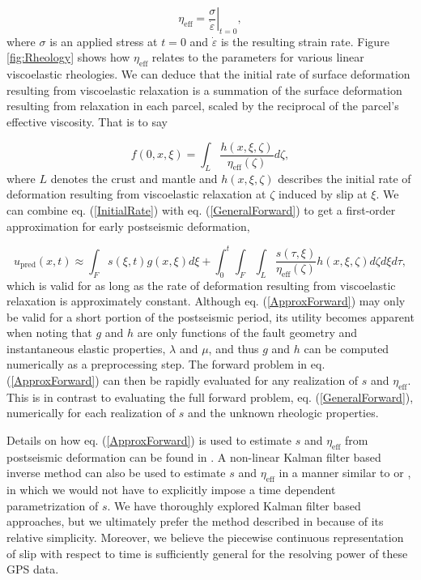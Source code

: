 \documentclass[draft,linenumbers]{AGUJournal}
\begin{document}
\begin{equation}
  \eta_\mathrm{eff} = \left.\frac{\sigma}{\dot{\varepsilon}}\right|_{t=0},
\end{equation}
where $\sigma$ is an applied stress at $t=0$ and $\dot\varepsilon$ is the resulting strain rate.  Figure \ref{fig:Rheology} shows how $\eta_\mathrm{eff}$ relates to the parameters for various linear viscoelastic rheologies.   We can deduce that the initial rate of surface deformation resulting from viscoelastic relaxation is a summation of the surface deformation resulting from relaxation in each parcel, scaled by the reciprocal of the parcel's effective viscosity.  That is to say   

\begin{equation}\label{InitialRate}
  f(0,x,\xi) = \int_L \frac{h(x,\xi,\zeta)}{\eta_\mathrm{eff}(\zeta)} d\zeta, 
\end{equation}
where $L$ denotes the crust and mantle and $h(x,\xi,\zeta)$ describes the initial rate of deformation resulting from viscoelastic relaxation at $\zeta$ induced by slip at $\xi$. We can combine eq. (\ref{InitialRate}) with eq. (\ref{GeneralForward}) to get a first-order approximation for early postseismic deformation,

\begin{equation}\label{ApproxForward}
  u_\mathrm{pred}(x,t) \approx \int_F s(\xi,t)g(x,\xi)d\xi + 
           \int_0^t\int_F\int_L \frac{s(\tau,\xi)}{\eta_\mathrm{eff}(\zeta)} h(x,\xi,\zeta) d\zeta d\xi d\tau,
\end{equation}
which is valid for as long as the rate of deformation resulting from viscoelastic relaxation is approximately constant.  Although eq. (\ref{ApproxForward}) may only be valid for a short portion of the postseismic period, its utility becomes apparent when noting that $g$ and $h$ are only functions of the fault geometry and instantaneous elastic properties, $\lambda$ and $\mu$, and thus $g$ and $h$ can be computed numerically as a preprocessing step.  The forward problem in eq. (\ref{ApproxForward}) can then be rapidly evaluated for any realization of $s$ and $\eta_{\mathrm{eff}}$.  This is in contrast to evaluating the full forward problem, eq. (\ref{GeneralForward}), numerically for each realization of $s$ and the unknown rheologic properties. 

Details on how eq. (\ref{ApproxForward}) is used to estimate $s$ and $\eta_\mathrm{eff}$ from postseismic deformation can be found in \citet{Hines2016}.  A non-linear Kalman filter based inverse method can also be used to estimate $s$ and $\eta_{\mathrm{eff}}$ in a manner similar to \citet{Segall1997} or \citet{McGuire2003}, in which we would not have to explicitly impose a time dependent parametrization of $s$. We have thoroughly explored Kalman filter based approaches, but we ultimately prefer the method described in \citet{Hines2016} because of its relative simplicity. Moreover, we believe the piecewise continuous representation of slip with respect to time is sufficiently general for the resolving power of these GPS data.
\end{document}
